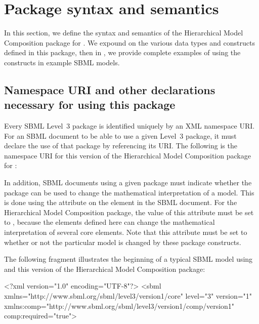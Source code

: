 
\newcommand{\fixttspace}{\hspace*{1pt}}

\section{Package syntax and semantics}
\label{sec:syntax}

In this section, we define the syntax and semantics of the Hierarchical Model Composition package for \sbmlthreecore.  We expound on the various data types and constructs defined in this package, then in , we provide complete examples of using the constructs in example SBML models.

\subsection{Namespace URI and other declarations necessary for using this package}
\label{xml-namespace}

Every SBML Level~3 package is identified uniquely by an XML namespace URI.  For an SBML document to be able to use a given Level~3 package, it must declare the use of that package by referencing its URI. The following is the namespace URI for this version of the Hierarchical Model Composition package for \sbmlthreecore:
\begin{center}
\end{center}

In addition, SBML documents using a given package must indicate whether the package can be used to change the mathematical interpretation of a model.  This is done using the attribute  on the  element in the SBML document.  For the Hierarchical Model Composition package, the value of this attribute must be set to , because the elements defined here can change the mathematical interpretation of several core elements.  Note that this attribute must be set to  whether or not the particular model is changed by these package constructs.

The following fragment illustrates the beginning of a typical SBML model using \sbmlthreecore and this version of the Hierarchical Model Composition package:

\begin{example}
<?xml version="1.0" encoding="UTF-8"?>
<sbml xmlns="http://www.sbml.org/sbml/level3/version1/core" level="3" version="1"
      xmlns:comp="http://www.sbml.org/sbml/level3/version1/comp/version1" comp:required="true">
\end{example}
   

